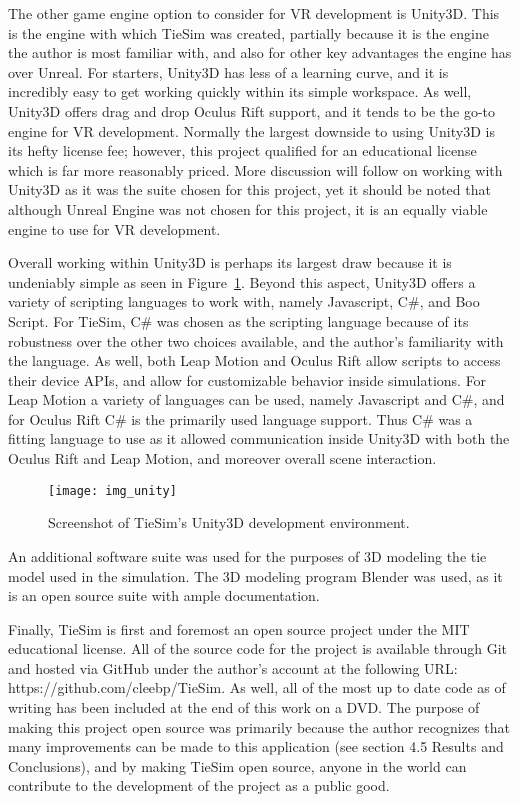 The other game engine option to consider for VR development is Unity3D. This is the engine with which TieSim was created, partially because it is the engine the author is most familiar with, and also for other key advantages the engine has over Unreal. For starters, Unity3D has less of a learning curve, and it is incredibly easy to get working quickly within its simple workspace. As well, Unity3D offers drag and drop Oculus Rift support, and it tends to be the go-to engine for VR development. Normally the largest downside to using Unity3D is its hefty license fee; however, this project qualified for an educational license which is far more reasonably priced. More discussion will follow on working with Unity3D as it was the suite chosen for this project, yet it should be noted that although Unreal Engine was not chosen for this project, it is an equally viable engine to use for VR development. 

Overall working within Unity3D is perhaps its largest draw because it is undeniably simple as seen in Figure~\ref{figure:f_unity}. Beyond this aspect, Unity3D offers a variety of scripting languages to work with, namely Javascript, C\#, and Boo Script. For TieSim, C\# was chosen as the scripting language because of its robustness over the other two choices available, and the author's familiarity with the language. As well, both Leap Motion and Oculus Rift allow scripts to access their device APIs, and allow for customizable behavior inside simulations. For Leap Motion a variety of languages can be used, namely Javascript and C\#, and for Oculus Rift C\# is the primarily used language support. Thus C\# was a fitting language to use as it allowed communication inside Unity3D with both the Oculus Rift and Leap Motion, and moreover overall scene interaction.

\begin{figure}
  \centering
  \texttt{[image: img\_unity]}
  \caption{Screenshot of TieSim's Unity3D development environment.}
  \label{figure:f_unity}
\end{figure}

An additional software suite was used for the purposes of 3D modeling the tie model used in the simulation. The 3D modeling program Blender was used, as it is an open source suite with ample documentation.

Finally, TieSim is first and foremost an open source project under the MIT educational license. All of the source code for the project is available through Git and hosted via GitHub under the author's account at the following URL: https://github.com/cleebp/TieSim. As well, all of the most up to date code as of writing has been included at the end of this work on a DVD. The purpose of making this project open source was primarily because the author recognizes that many improvements can be made to this application (see section 4.5 Results and Conclusions), and by making TieSim open source, anyone in the world can contribute to the development of the project as a public good.

